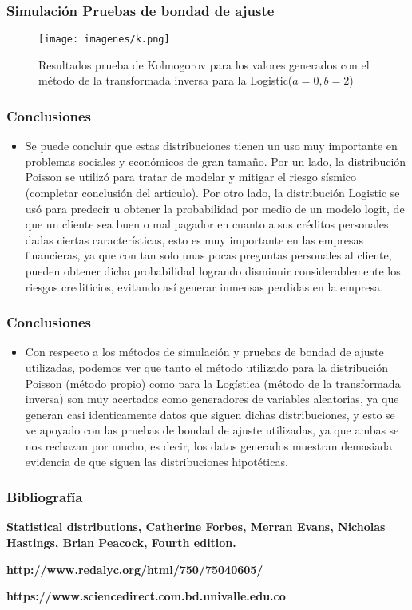 \documentclass[12pt]{beamer}
\begin{document}
\begin{frame}
\frametitle{Simulación Pruebas de bondad de ajuste}
\begin{figure}
  \centering
  \texttt{[image: imagenes/k.png]}
  \caption{Resultados prueba de Kolmogorov para los valores generados con el método de la transformada inversa para la Logistic($a=0,b=2$)}\label{figura1}
\end{figure}
\end{frame}


\begin{frame}
\frametitle{Conclusiones}
\begin{itemize}
\item Se puede concluir que estas distribuciones tienen un uso muy importante en problemas sociales y económicos de gran tamaño. Por un lado, la distribución Poisson se utilizó para tratar de modelar y mitigar el riesgo sísmico (completar conclusión del articulo). Por otro lado, la distribución Logistic se usó para predecir u obtener la probabilidad por medio de un modelo logit, de que un cliente sea buen o mal pagador en cuanto a sus créditos personales dadas ciertas características, esto es muy importante en las empresas financieras, ya que con tan solo unas pocas preguntas personales al cliente, pueden obtener dicha probabilidad logrando disminuir considerablemente los riesgos crediticios, evitando así generar inmensas perdidas en la empresa.
\end{itemize}
\end{frame}

\begin{frame}
\frametitle{Conclusiones}
\begin{itemize}
\item Con respecto a los métodos de simulación y pruebas de bondad de ajuste utilizadas, podemos ver que tanto el método utilizado para la distribución Poisson (método propio) como para la Logística (método de la transformada inversa) son muy acertados como generadores de variables aleatorias, ya que generan casi identicamente datos que siguen dichas distribuciones, y esto se ve apoyado con las pruebas de bondad de ajuste utilizadas, ya que ambas se nos rechazan por mucho, es decir, los datos generados muestran demasiada evidencia de que siguen las distribuciones hipotéticas.
\end{itemize}
\end{frame}

\begin{frame}
\frametitle{Bibliografía}
\begin{block}{\textbf {Statistical distributions, Catherine Forbes, Merran Evans, Nicholas Hastings, Brian Peacock, Fourth edition.}}
\end{block}	
\begin{block}{\textbf {http://www.redalyc.org/html/750/75040605/}}
\end{block}
\begin{block}{\textbf {https://www.sciencedirect.com.bd.univalle.edu.co}}
\end{block}
\end{frame}
\end{document}
